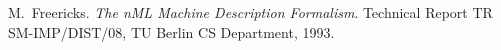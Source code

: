 \begin{thebibliography}{99}

M.~Freericks.
\emph{The nML Machine Description Formalism}.
Technical Report TR SM-IMP/DIST/08, TU Berlin CS Department, 1993.

\end{thebibliography}
